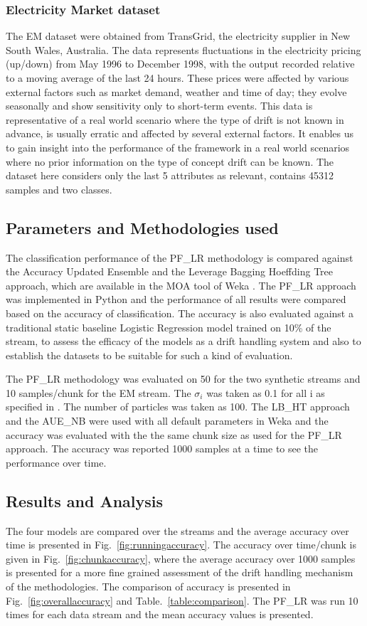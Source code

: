 \documentclass[conference]{IEEEtran}
\begin{document}
\subsubsection{Electricity Market dataset}
The EM dataset were obtained from TransGrid, the electricity supplier in New South Wales, Australia. The data represents fluctuations in the electricity pricing (up/down) from May 1996 to December 1998, with the output recorded relative to a moving average of the last 24 hours. These prices were affected by various external factors such as market demand, weather and time of day; they evolve seasonally and show sensitivity only to short-term events. This data is representative of a real world scenario where the type of drift is not known in advance, is usually erratic and affected by several external factors. It enables us to gain insight into the performance of the framework in a real world scenarios where no prior information on the type of concept drift can be known. The dataset here considers only the last 5 attributes as relevant, contains 45312 samples and two classes. 

\subsection{Parameters and Methodologies used}
The classification performance of the PF\_LR methodology is compared against the Accuracy Updated Ensemble and the Leverage Bagging Hoeffding Tree approach, which are available in the MOA tool of Weka \cite{moa}. The PF\_LR approach was implemented in Python and the performance of all results were compared based on the accuracy of classification. The accuracy is also evaluated against a traditional static baseline Logistic Regression model trained on 10\% of the stream, to assess the efficacy of the models as a drift handling system and also to establish the datasets to be suitable for such a kind of evaluation. 

The PF\_LR methodology was evaluated on 50 for the two synthetic streams and 10 samples/chunk for the EM stream. The $\sigma_i$ was taken as 0.1 for all i as specified in \cite{pflr}. The number of particles was taken as 100. The LB\_HT approach and the AUE\_NB were used with all default parameters in Weka and the accuracy was evaluated with the the same chunk size as used for the PF\_LR approach. The accuracy was reported 1000 samples at a time to see the performance over time. 

\subsection{Results and Analysis}
The four models are compared over the streams and the average accuracy over time is presented in Fig.~\ref{fig:runningaccuracy}. The accuracy over time/chunk is given in Fig.~\ref{fig:chunkaccuracy}, where the average accuracy over 1000 samples is presented for a more fine grained assessment of the drift handling mechanism of the methodologies. The comparison of accuracy is presented in Fig.~\ref{fig:overallaccuracy} and Table.~\ref{table:comparison}. The PF\_LR was run 10 times for each data stream and the mean accuracy values is presented.
\end{document}
